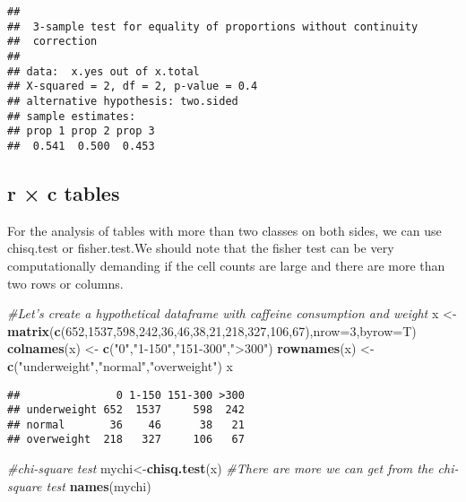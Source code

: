 \documentclass[]{book}
\newenvironment{Shaded}{\begin{snugshade}}{\end{snugshade}}
\newcommand{\KeywordTok}[1]{\textcolor[rgb]{0.13,0.29,0.53}{\textbf{#1}}}
\newcommand{\DataTypeTok}[1]{\textcolor[rgb]{0.13,0.29,0.53}{#1}}
\newcommand{\DecValTok}[1]{\textcolor[rgb]{0.00,0.00,0.81}{#1}}
\newcommand{\StringTok}[1]{\textcolor[rgb]{0.31,0.60,0.02}{#1}}
\newcommand{\CommentTok}[1]{\textcolor[rgb]{0.56,0.35,0.01}{\textit{#1}}}
\newcommand{\NormalTok}[1]{#1}
\theoremstyle{definition}
\theoremstyle{definition}
\theoremstyle{definition}
\theoremstyle{remark}
\begin{document}
\begin{verbatim}
## 
##  3-sample test for equality of proportions without continuity
##  correction
## 
## data:  x.yes out of x.total
## X-squared = 2, df = 2, p-value = 0.4
## alternative hypothesis: two.sided
## sample estimates:
## prop 1 prop 2 prop 3 
##  0.541  0.500  0.453
\end{verbatim}

\subsection{r × c tables}\label{r-c-tables}

For the analysis of tables with more than two classes on both sides, we
can use chisq.test or fisher.test.We should note that the fisher test
can be very computationally demanding if the cell counts are large and
there are more than two rows or columns.

\begin{Shaded}
\begin{Highlighting}[]
\CommentTok{#Let's create a hypothetical dataframe with caffeine consumption and weight }
\NormalTok{x <-}\StringTok{ }\KeywordTok{matrix}\NormalTok{(}\KeywordTok{c}\NormalTok{(}\DecValTok{652}\NormalTok{,}\DecValTok{1537}\NormalTok{,}\DecValTok{598}\NormalTok{,}\DecValTok{242}\NormalTok{,}\DecValTok{36}\NormalTok{,}\DecValTok{46}\NormalTok{,}\DecValTok{38}\NormalTok{,}\DecValTok{21}\NormalTok{,}\DecValTok{218}\NormalTok{,}\DecValTok{327}\NormalTok{,}\DecValTok{106}\NormalTok{,}\DecValTok{67}\NormalTok{),}\DataTypeTok{nrow=}\DecValTok{3}\NormalTok{,}\DataTypeTok{byrow=}\NormalTok{T)}
\KeywordTok{colnames}\NormalTok{(x) <-}\StringTok{ }\KeywordTok{c}\NormalTok{(}\StringTok{"0"}\NormalTok{,}\StringTok{"1-150"}\NormalTok{,}\StringTok{"151-300"}\NormalTok{,}\StringTok{">300"}\NormalTok{)}
\KeywordTok{rownames}\NormalTok{(x) <-}\StringTok{ }\KeywordTok{c}\NormalTok{(}\StringTok{"underweight"}\NormalTok{,}\StringTok{"normal"}\NormalTok{,}\StringTok{"overweight"}\NormalTok{)}
\NormalTok{x}
\end{Highlighting}
\end{Shaded}

\begin{verbatim}
##               0 1-150 151-300 >300
## underweight 652  1537     598  242
## normal       36    46      38   21
## overweight  218   327     106   67
\end{verbatim}

\begin{Shaded}
\begin{Highlighting}[]
\CommentTok{#chi-square test}
\NormalTok{mychi<-}\KeywordTok{chisq.test}\NormalTok{(x)}
\CommentTok{#There are more we can get from the chi-square test}
\KeywordTok{names}\NormalTok{(mychi)}
\end{Highlighting}
\end{Shaded}
\end{document}
